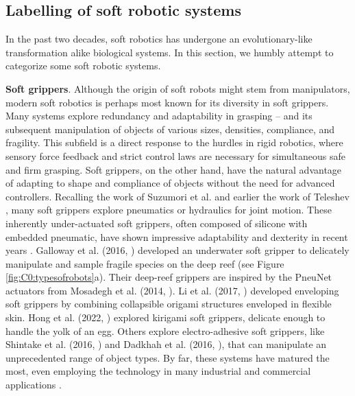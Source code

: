 \vspace{-4mm}
\subsection{Labelling of soft robotic systems}
In the past two decades, soft robotics has undergone an evolutionary-like transformation alike biological systems. In this section, we humbly attempt to  categorize some soft robotic systems. 

\textbf{Soft grippers}. Although the origin of soft robots might stem from manipulators, modern soft robotics is perhaps most known for its diversity in soft grippers. Many systems explore redundancy and adaptability in grasping -- and its subsequent manipulation of objects of various sizes, densities, compliance, and fragility. This subfield is a direct response to the hurdles in rigid robotics, where sensory force feedback and strict control laws are necessary for simultaneous safe and firm grasping. Soft grippers, on the other hand, have the natural advantage of adapting to shape and compliance of objects without the need for advanced controllers. Recalling the work of Suzumori et al. \cite{Suzumori1991,Suzumori1992} and earlier the work of Teleshev \cite{Teleshev1981}, many soft grippers explore pneumatics or hydraulics for joint motion. These inherently under-actuated soft grippers, often composed of silicone with embedded pneumatic, have shown impressive adaptability and dexterity in recent years \cite{Ilievski2011Feb,Deimel2015Aug}. Galloway et al. (2016, \cite{Galloway2016}) developed an underwater soft gripper to delicately manipulate and sample fragile species on the deep reef (see Figure \ref{fig:C0:typesofrobots}a). Their deep-reef grippers are inspired by the PneuNet actuators from Mosadegh et al. (2014, \cite{Mosadegh2014}). Li et al. (2017, \cite{Li2017Dec}) developed enveloping soft grippers by combining collapsible origami structures enveloped in flexible skin. Hong et al. (2022, \cite{Hong2022Jan}) explored kirigami soft grippers, delicate enough to handle the yolk of an egg. Others explore electro-adhesive soft grippers, like Shintake et al. (2016, \cite{Shintake2016Jan}) and Dadkhah et al. (2016, \cite{Dadkhah2016}), that can manipulate an unprecedented range of object types. By far, these systems have matured the most, even employing the technology in many industrial and commercial applications \cite{Labs2021Jul,Ansari2022Sep}.
%
